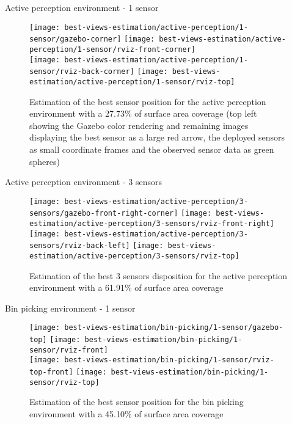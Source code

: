 \begin{frame}{Active perception environment - 1 sensor}
	\begin{figure}
		\centering
		\texttt{[image: best-views-estimation/active-perception/1-sensor/gazebo-corner]}\hspace{4em}
		\texttt{[image: best-views-estimation/active-perception/1-sensor/rviz-front-corner]}\\
		\texttt{[image: best-views-estimation/active-perception/1-sensor/rviz-back-corner]}\hspace{2em}
		\texttt{[image: best-views-estimation/active-perception/1-sensor/rviz-top]}
		\caption{Estimation of the best sensor position for the active perception environment with a 27.73\% of surface area coverage (top left showing the Gazebo color rendering and remaining images displaying the best sensor as a large red arrow, the deployed sensors as small coordinate frames and the observed sensor data as green spheres)}
	\end{figure}
\end{frame}


\begin{frame}{Active perception environment - 3 sensors}
	\begin{figure}
		\centering
		\texttt{[image: best-views-estimation/active-perception/3-sensors/gazebo-front-right-corner]}\hspace{4em}
		\texttt{[image: best-views-estimation/active-perception/3-sensors/rviz-front-right]}\\
		\texttt{[image: best-views-estimation/active-perception/3-sensors/rviz-back-left]}\hspace{2em}
		\texttt{[image: best-views-estimation/active-perception/3-sensors/rviz-top]}
		\caption{Estimation of the best 3 sensors disposition for the active perception environment with a 61.91\% of surface area coverage}
	\end{figure}
\end{frame}


\begin{frame}{Bin picking environment - 1 sensor}
	\begin{figure}
		\centering
		\texttt{[image: best-views-estimation/bin-picking/1-sensor/gazebo-top]}\hspace{2em}
		\texttt{[image: best-views-estimation/bin-picking/1-sensor/rviz-front]}\\
		\texttt{[image: best-views-estimation/bin-picking/1-sensor/rviz-top-front]}\hspace{4em}
		\texttt{[image: best-views-estimation/bin-picking/1-sensor/rviz-top]}
		\caption{Estimation of the best sensor position for the bin picking environment with a 45.10\% of surface area coverage}
	\end{figure}
\end{frame}


